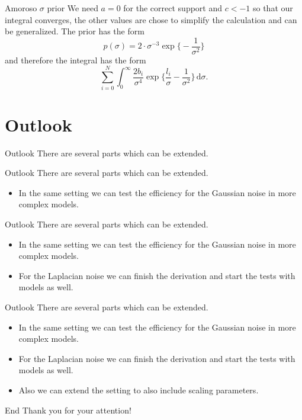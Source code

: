 \documentclass{beamer}
\newcommand{\dx}{\, \mathrm{d}}
\begin{document}
	\begin{frame}{Amoroso $\sigma$ prior}
		We need $a = 0$ for the correct support and $c < -1$ so that our integral 
		converges, the other values are chose to simplify the calculation and can 
		be generalized. The prior has the form
		\[
			p(\sigma) = 2 \cdot \sigma^{-3} \exp\biggl\{ -\frac{1}{\sigma^2}
			\biggr\}
		\]
		and therefore the integral has the form
		\[
			\sum_{i = 0}^N  \int_0^\infty \frac{2 b_i} {\sigma^4} \exp 
			\biggl\{\frac{l_i}{\sigma} - \frac{1}{\sigma^2} \biggr\} \dx \sigma.
		\]
	\end{frame}
	
\section{Outlook}
	\begin{frame}{Outlook}
		There are several parts which can be extended.
	\end{frame}
	
	\begin{frame}[noframenumbering]{Outlook}
		There are several parts which can be extended.
		\begin{itemize}
			\item In the same setting we can test the efficiency for the Gaussian 
			noise in more complex models.
		\end{itemize}
	\end{frame}
	
	\begin{frame}[noframenumbering]{Outlook}
		There are several parts which can be extended.
		\begin{itemize}
			\item In the same setting we can test the efficiency for the Gaussian 
			noise in more complex models.
			\item For the Laplacian noise we can finish the derivation and start 
			the tests with models as well.
		\end{itemize}
	\end{frame}
	
	\begin{frame}[noframenumbering]{Outlook}
		There are several parts which can be extended.
		\begin{itemize}
			\item In the same setting we can test the efficiency for the Gaussian 
			noise in more complex models.
			\item For the Laplacian noise we can finish the derivation and start 
			the tests with models as well.
			\item Also we can extend the setting to also include scaling 
			parameters.
		\end{itemize}
	\end{frame}
	
	\begin{frame}{End}
		Thank you for your attention!
	\end{frame}
	
\end{document}

